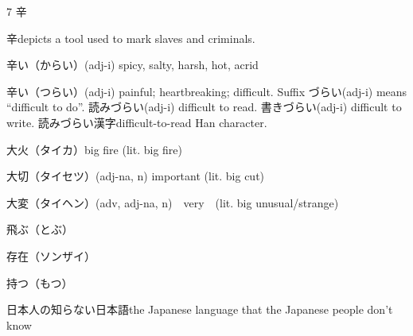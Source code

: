 7 辛

辛depicts a tool used to mark slaves and criminals.

辛い（からい）(adj-i) spicy, salty, harsh, hot, acrid

辛い（つらい）(adj-i) painful; heartbreaking; difficult.
Suffix づらい(adj-i) means ``difficult to do''.
読みづらい(adj-i) difficult to read.
書きづらい(adj-i) difficult to write.
読みづらい漢字difficult-to-read Han character.

大火（タイカ）big fire (lit. big fire)

大切（タイセツ）(adj-na, n) important (lit. big cut)

大変（タイヘン）(adv, adj-na, n)　very　(lit. big unusual/strange)

飛ぶ（とぶ）

存在（ソンザイ）

持つ（もつ）

日本人の知らない日本語the Japanese language that the Japanese people don't know
